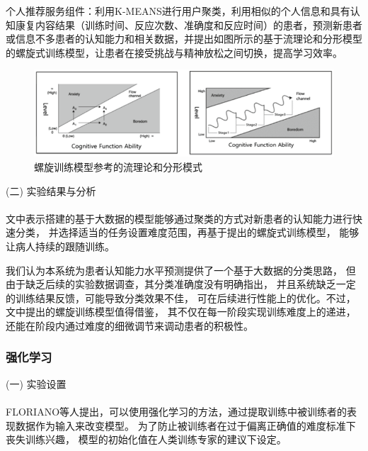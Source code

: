 \documentclass[12pt]{article}
\begin{document}
            个人推荐服务组件：利用K-MEANS进行用户聚类，利用相似的个人信息和具有认知康复内容结果（训练时间、反应次数、准确度和反应时间）的患者，预测新患者或信息不多患者的认知能力和相关数据，并提出如图所示的基于流理论和分形模型的螺旋式训练模型，让患者在接受挑战与精神放松之间切换，提高学习效率。
            \begin{figure}[H]
            	
            	\centering
            	\includegraphics[scale=0.7]{images/flow_theory.png}
            	\caption{螺旋训练模型参考的流理论和分形模式}
            	\label{fig:label}
            \end{figure}
            
            


            (二) 实验结果与分析\paragraph{}
            文中表示搭建的基于大数据的模型能够通过聚类的方式对新患者的认知能力进行快速分类，
            并选择适当的任务设置难度范围，再基于提出的螺旋式训练模型，
            能够让病人持续的跟随训练。

            我们认为本系统为患者认知能力水平预测提供了一个基于大数据的分类思路，
            但由于缺乏后续的实验数据调查，其分类准确度没有明确指出，
            并且系统缺乏一定的训练结果反馈，可能导致分类效果不佳，
            可在后续进行性能上的优化。不过，文中提出的螺旋训练模型值得借鉴，
            其不仅在每一阶段实现训练难度上的递进，
            还能在阶段内通过难度的细微调节来调动患者的积极性。






            \subsubsection{强化学习}
            (一) 实验设置\paragraph{}
            FLORIANO\cite{ref12}等人提出，可以使用强化学习的方法，通过提取训练中被训练者的表现数据作为输入来改变模型。
            为了防止被训练者在过于偏离正确值的难度标准下丧失训练兴趣，
            模型的初始化值在人类训练专家的建议下设定。
\end{document}
